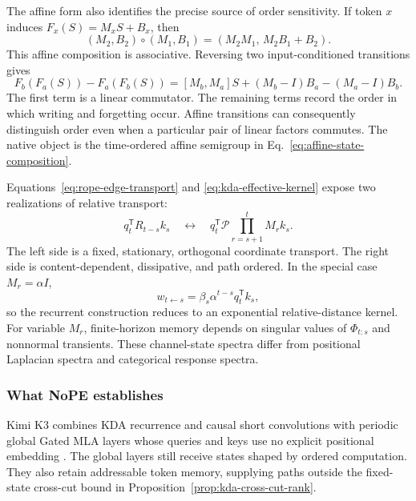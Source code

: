 \documentclass[10pt]{article}
\theoremstyle{definition}
\theoremstyle{remark}
\newcommand{\BookSubsection}[1]{\subsubsection{#1}}
\begin{document}
The affine form also identifies the precise source of order sensitivity.  If token $x$ induces
$F_x(S)=M_xS+B_x$, then
\begin{equation}
(M_2,B_2)\circ(M_1,B_1)
=\left(M_2M_1,\,M_2B_1+B_2\right).
\label{eq:affine-state-composition}
\end{equation}
This affine composition is associative.  Reversing two input-conditioned transitions gives
\begin{equation}
F_b(F_a(S))-F_a(F_b(S))
=[M_b,M_a]S+(M_b-I)B_a-(M_a-I)B_b.
\label{eq:affine-order-defect}
\end{equation}
The first term is a linear commutator.  The remaining terms record the order in which writing and
forgetting occur.  Affine transitions can consequently distinguish order even when a particular
pair of linear factors commutes.  The native object is the time-ordered affine semigroup in
Eq.~\ref{eq:affine-state-composition}.

Equations~\ref{eq:rope-edge-transport} and \ref{eq:kda-effective-kernel} expose two realizations of
relative transport:
\begin{equation}
q_t^{\mathsf T}R_{t-s}k_s
\quad\longleftrightarrow\quad
q_t^{\mathsf T}\mathcal P\!\prod_{r=s+1}^{t}M_r k_s.
\label{eq:coordinate-state-transport-comparison}
\end{equation}
The left side is a fixed, stationary, orthogonal coordinate transport.  The right side is
content-dependent, dissipative, and path ordered.  In the special case $M_r=\alpha I$,
\begin{equation}
w_{t\leftarrow s}=\beta_s\alpha^{t-s}q_t^{\mathsf T}k_s,
\label{eq:kda-exponential-distance}
\end{equation}
so the recurrent construction reduces to an exponential relative-distance kernel.  For variable
$M_r$, finite-horizon memory depends on singular values of $\Phi_{t:s}$ and nonnormal transients.
These channel-state spectra differ from positional Laplacian spectra and categorical response
spectra.

\BookSubsection{What NoPE establishes}

Kimi K3 combines KDA recurrence and causal short convolutions with periodic global Gated MLA
layers whose queries and keys use no explicit positional embedding \cite{kimik3}.  The global
layers still receive states shaped by ordered computation.  They also retain addressable token
memory, supplying paths outside the fixed-state cross-cut bound in
Proposition~\ref{prop:kda-cross-cut-rank}.
\end{document}
